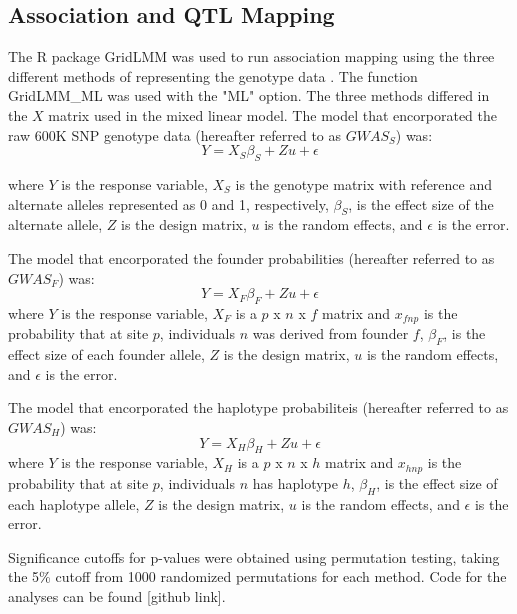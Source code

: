 \documentclass[article,9pt,twocolumn,twoside]{rilabRxiv}
\begin{document}
\subsection{Association and QTL Mapping}
The R package GridLMM was used to run association mapping using the three different methods of representing the genotype data \citep{RN14}. The function GridLMM\_ML was used with the "ML" option.  The three methods differed in the $X$ matrix used in the mixed linear model. The model that encorporated the raw 600K SNP genotype data (hereafter referred to as $GWAS_S$) was:
\begin{equation}
\label{eqn:gridlmm1}
 Y = X_S{\beta_S} + Zu + \epsilon
\end{equation}

where $Y$ is the response variable, $X_S$ is the genotype matrix with reference and alternate alleles represented as 0 and 1, respectively, $\beta_S$, is the effect size of the alternate allele, $Z$ is the design matrix, $u$ is the random effects, and $\epsilon$ is the error.

The model that encorporated the founder probabilities (hereafter referred to as $GWAS_F$) was:
\begin{equation}
\label{eqn:gridlmm2}
 Y = X_F{\beta_F} + Zu + \epsilon
\end{equation}
where $Y$ is the response variable, $X_F$ is a $p$ x $n$ x $f$ matrix and $x_{fnp}$ is the probability that at site $p$, individuals $n$ was derived from founder $f$, $\beta_F$, is the effect size of each founder allele, $Z$ is the design matrix, $u$ is the random effects, and $\epsilon$ is the error.

The model that encorporated the haplotype probabiliteis (hereafter referred to as $GWAS_H$) was:
\begin{equation}
\label{eqn:gridlmm3}
 Y = X_H{\beta_H} + Zu + \epsilon
\end{equation}
where $Y$ is the response variable, $X_H$ is a $p$ x $n$ x $h$ matrix and $x_{hnp}$ is the probability that at site $p$, individuals $n$ has haplotype $h$, $\beta_H$, is the effect size of each haplotype allele, $Z$ is the design matrix, $u$ is the random effects, and $\epsilon$ is the error.

 Significance cutoffs for p-values were obtained using permutation testing, taking the 5\% cutoff from 1000 randomized permutations for each method. Code for the analyses can be found [github link].
\end{document}
